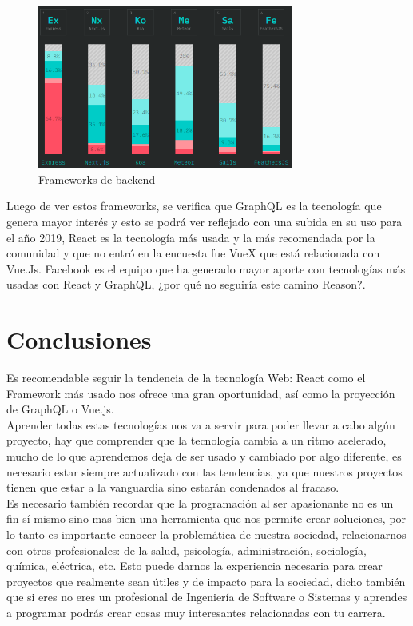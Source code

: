 \documentclass[twocolumns,a4paper]{IEEEtran}
\begin{document}
\begin{figure}[ht]
   \centering
      \includegraphics[width=3.3in]{./pictures/backend_frameworks.png}
   \caption{Frameworks de backend}
   \label{fig:data_layer}
\end{figure}

Luego de ver estos frameworks, se verifica que GraphQL es la tecnología que
genera mayor interés y esto se podrá ver reflejado con una subida en su uso
para el año 2019, React es la tecnología más usada y la más recomendada por la
comunidad y que no entró en la encuesta fue VueX que está relacionada con
Vue.Js. Facebook es el equipo que ha generado mayor aporte con tecnologías más
usadas con React y GraphQL, ¿por qué no seguiría este camino Reason?.

\section{Conclusiones}
Es recomendable seguir la tendencia de la tecnología Web: React como el
Framework más usado nos ofrece una gran oportunidad, así como la proyección de
GraphQL o Vue.js.\\
Aprender todas estas tecnologías nos va a servir para poder llevar a cabo algún
proyecto, hay que comprender que la tecnología cambia a un ritmo acelerado,
mucho de lo que aprendemos deja de ser usado y cambiado por algo diferente, es
necesario estar siempre actualizado con las tendencias, ya que nuestros
proyectos tienen que estar a la vanguardia sino estarán condenados al
fracaso.\\
Es necesario también recordar que la programación al ser apasionante no es un
fin sí mismo sino mas bien una herramienta que nos permite crear soluciones,
por lo tanto es importante conocer la problemática de nuestra sociedad,
relacionarnos con otros profesionales: de la salud, psicología, administración,
sociología, química, eléctrica, etc. Esto puede darnos la experiencia necesaria
para crear proyectos que realmente sean útiles y de impacto para la sociedad,
dicho también que si eres no eres un profesional de Ingeniería de Software o
Sistemas y aprendes a programar podrás crear cosas muy interesantes
relacionadas con tu carrera.


\printbibliography
\end{document}
